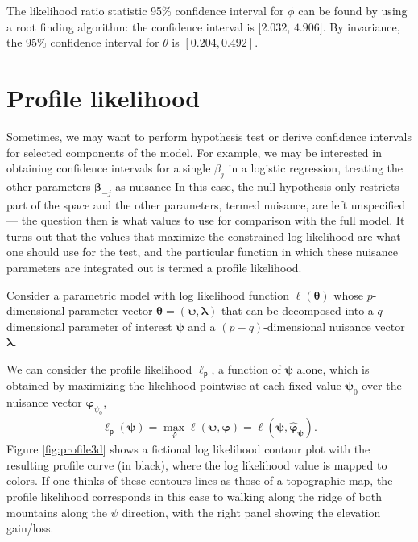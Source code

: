 \documentclass[
  11pt,
  letterpaper,
]{book}
\theoremstyle{definition}
\theoremstyle{definition}
\theoremstyle{definition}
\theoremstyle{definition}
\theoremstyle{remark}
\begin{document}
The likelihood ratio statistic 95\% confidence interval for \(\phi\) can be found by using a root finding algorithm: the confidence interval is \([2.032\), \(4.906]\). By invariance, the 95\% confidence interval for \(\theta\) is \([0.204, 0.492]\).

\hypertarget{profile-likelihood}{%
\section{Profile likelihood}\label{profile-likelihood}}

Sometimes, we may want to perform hypothesis test or derive confidence intervals for selected components of the model. For example, we may be interested in obtaining confidence intervals for a single \(\beta_j\) in a logistic regression, treating the other parameters \(\boldsymbol{\beta}_{-j}\) as nuisance In this case, the null hypothesis only restricts part of the space and the other parameters, termed nuisance, are left unspecified --- the question then is what values to use for comparison with the full model. It turns out that the values that maximize the constrained log likelihood are what one should use for the test, and the particular function in which these nuisance parameters are integrated out is termed a profile likelihood.

Consider a parametric model with log likelihood function \(\ell(\boldsymbol{\theta})\) whose \(p\)-dimensional parameter vector \(\boldsymbol{\theta}=(\boldsymbol{\psi}, \boldsymbol{\lambda})\) that can be decomposed into a \(q\)-dimensional parameter of interest \(\boldsymbol{\psi}\) and a \((p-q)\)-dimensional nuisance vector \(\boldsymbol{\lambda}\).

We can consider the profile likelihood \(\ell_{\mathsf{p}}\), a function of \(\boldsymbol{\psi}\) alone, which is obtained by maximizing the likelihood pointwise at each fixed value \(\boldsymbol{\psi}_0\) over the nuisance vector \(\boldsymbol{\varphi}_{\psi_0}\),
\begin{align*}
\ell_{\mathsf{p}}(\boldsymbol{\psi})=\max_{\boldsymbol{\varphi}}\ell(\boldsymbol{\psi}, \boldsymbol{\varphi})=\ell(\boldsymbol{\psi}, \widehat{\boldsymbol{\varphi}}_{\boldsymbol{\psi}}).
\end{align*}
Figure \ref{fig:profile3d} shows a fictional log likelihood contour plot with the resulting profile curve (in black), where the log likelihood value is mapped to colors. If one thinks of these contours lines as those of a topographic map, the profile likelihood corresponds in this case to walking along the ridge of both mountains along the \(\psi\) direction, with the right panel showing the elevation gain/loss.
\end{document}
